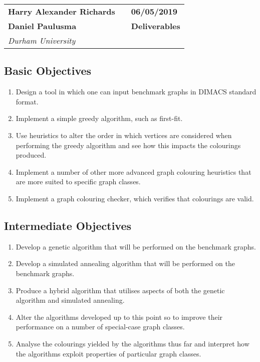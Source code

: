 \documentclass[12pt,a4paper]{article}
\begin{document}
\begin{tabular}[t]{p{}  p{}  p{}}
  \textbf{Harry Alexander Richards}  & & \textbf{06/05/2019} \\
  \textbf{Daniel Paulusma} & & \textbf{Deliverables} \\
  \textit{Durham University} & & 
\end{tabular}

\vspace{1cm}

\subsection*{Basic Objectives}
\begin{enumerate}[label = \textbf{B\arabic*}]
\itemsep0em
\item Design a tool in which one can input benchmark graphs in DIMACS standard format. \label{obj:B1}
\item Implement a simple greedy algorithm, such as first-fit.  \label{obj:B2}
\item Use heuristics to alter the order in which vertices are considered when performing the greedy algorithm and see how this impacts the colourings produced. \label{obj:B3}
\item Implement a number of other more advanced graph colouring heuristics that are more suited to specific graph classes. \label{obj:B4}
\item Implement a graph colouring checker, which verifies that colourings are valid. \label{obj:B5}
\end{enumerate}

\subsection*{Intermediate Objectives}
\begin{enumerate}[label = \textbf{I\arabic*}]
\itemsep0em
\item Develop a genetic algorithm that will be performed on the benchmark graphs. \label{obj:I1}
\item Develop a simulated annealing algorithm that will be performed on the benchmark graphs. \label{obj:I2}
\item Produce a hybrid algorithm that utilises aspects of both the genetic algorithm and simulated annealing. \label{obj:I5}
\item Alter the algorithms developed up to this point so to improve their performance on a number of special-case graph classes. \label{obj:I3}
\item Analyse the colourings yielded by the algorithms thus far and interpret how the algorithms exploit properties of particular graph classes. \label{obj:I4}

\end{enumerate}  
\end{document}
